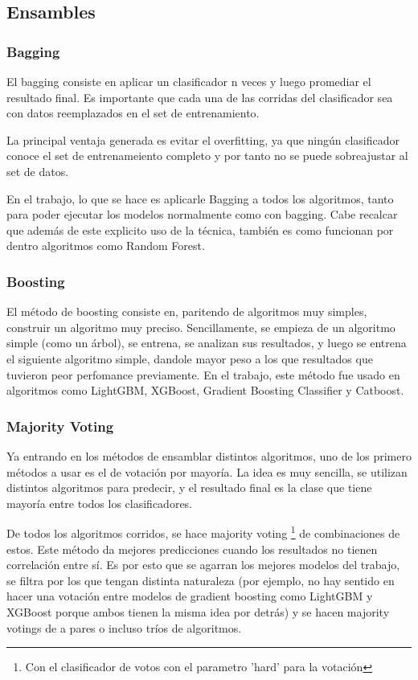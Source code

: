 \documentclass[a4paper]{article}
\begin{document}
\subsection{Ensambles}

\subsubsection{Bagging}

El bagging consiste en aplicar un clasificador n veces y luego promediar el resultado final. Es importante que cada una de las corridas del clasificador sea con datos reemplazados en el set de entrenamiento.

La principal ventaja generada es evitar el overfitting, ya que ningún clasificador conoce el set de entrenameiento completo y por tanto no se puede sobreajustar al set de datos.

En el trabajo, lo que se hace es aplicarle Bagging a todos los algoritmos, tanto para poder ejecutar los modelos normalmente como con bagging. Cabe recalcar que además de este explicito uso de la técnica, también es como funcionan por dentro algoritmos como Random Forest.

\subsubsection{Boosting}

El método de boosting consiste en, paritendo de algoritmos muy simples, construir un algoritmo muy preciso. Sencillamente, se empieza de un algoritmo simple (como un árbol), se entrena, se analizan sus resultados, y luego se entrena el siguiente algoritmo simple, dandole mayor peso a los que resultados que tuvieron peor perfomance previamente. En el trabajo, este método fue usado en algoritmos como LightGBM, XGBoost, Gradient Boosting Classifier y Catboost.

\subsubsection{Majority Voting}

Ya entrando en los métodos de ensamblar distintos algoritmos, uno de los primero métodos a usar es el de votación por mayoría. La idea es muy sencilla, se utilizan distintos algoritmos para predecir, y el resultado final es la clase que tiene mayoría entre todos los clasificadores.

De todos los algoritmos corridos, se hace majority voting \footnote{Con el clasificador de votos con el parametro 'hard' para la votación} de combinaciones de estos. Este método da mejores predicciones cuando los resultados no tienen correlación entre sí. Es por esto que se agarran los mejores modelos del trabajo, se filtra por los que tengan distinta naturaleza (por ejemplo, no hay sentido en hacer una votación entre modelos de gradient boosting como LightGBM y XGBoost porque ambos tienen la misma idea por detrás) y se hacen majority votings de a pares o incluso tríos de algoritmos.
\end{document}
